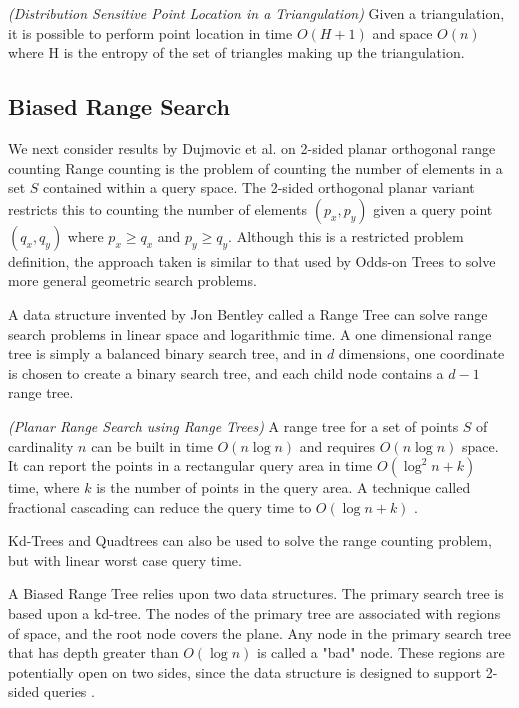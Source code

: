 \documentclass[mcs]{scsthesis}
\begin{document}
\begin{thm} \emph{(Distribution Sensitive Point Location in a Triangulation)} 
Given a triangulation, it is possible to perform point location in time
\(O(H + 1)\) and space \(O(n)\) where H is the entropy of the set of triangles
making up the triangulation. 
\end{thm}

\subsection{Biased Range Search}

We next consider results by Dujmovic et al. \cite{biasedrange} on 2-sided
planar orthogonal range counting Range counting is the problem of counting the
number of elements in a set \(S\) contained within a query space. The 2-sided
orthogonal planar variant restricts this to counting the number of elements
\((p_x, p_y)\) given a query point \((q_x, q_y)\) where \(p_x \ge q_x\) and
\(p_y \ge q_y\). Although this is a restricted problem definition, the approach
taken is similar to that used by Odds-on Trees to solve more general geometric 
search problems.

A data structure invented by Jon Bentley \cite{rangetree} called a Range Tree
can solve range search problems in linear space and logarithmic time. A one
dimensional range tree is simply a balanced binary search tree, and in \(d\)
dimensions, one coordinate is chosen to create a binary search tree, and each
child node contains a \(d - 1\) range tree. 

\begin{thm} \emph{(Planar Range Search using Range Trees)} 
A range tree for a set of points \(S\) of cardinality \(n\) can be built in
time \(O(n \log n)\) and requires \(O(n \log n)\) space. It can report the
points in a rectangular query area in time \(O(\log^2 n + k)\) time, where
\(k\) is the number of points in the query area. A technique called
fractional cascading can reduce the query time to \(O(\log n + k)\)
\cite{dutch}. 
\end{thm}

Kd-Trees and Quadtrees can also be used to solve the range counting problem,
but with linear worst case query time.

A Biased Range Tree relies upon two data structures. The primary search tree
is based upon a kd-tree. The nodes of the primary tree are associated with
regions of space, and the root node covers the plane. Any node in the primary
search tree that has depth greater than \(O(\log n)\) is called a "bad" node.
These regions are potentially open on two sides, since the data structure is
designed to support 2-sided queries \cite{biasedrange}. 
\end{document}
